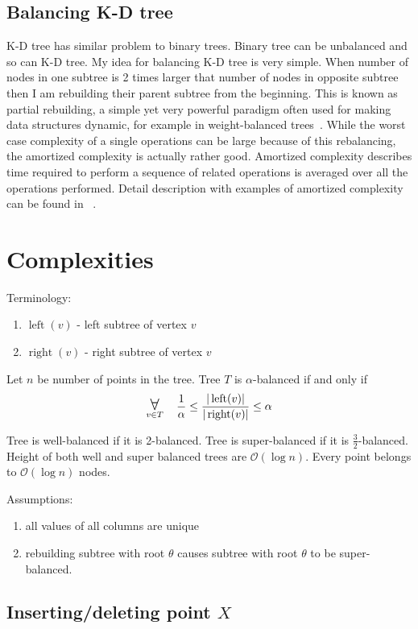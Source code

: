 \documentclass[10pt,a4paper]{article}
\DeclareMathOperator{\rightSon}{right}
\DeclareMathOperator{\leftSon}{left}
\newcommand{\Oh}{\mathcal{O}}
\newcommand\bigforall{\mbox{\Large $\mathsurround0pt\forall$}}
\begin{document}
\subsection{Balancing K-D tree}
K-D tree has similar problem to binary trees. Binary tree can be unbalanced and so can K-D tree. My idea for balancing K-D tree is very simple. When number of nodes in one subtree is 2 times larger that number of nodes in opposite subtree then I am rebuilding their parent subtree from the beginning.
This is known as partial rebuilding, a simple yet very powerful paradigm often used for making data structures dynamic, for example in weight-balanced trees~\cite{ALPHATREES}. While the worst case complexity of a single operations can be large because of this rebalancing, the amortized complexity is actually rather good. Amortized complexity describes time required to perform a sequence of related operations is averaged over all the operations performed. Detail description with examples of amortized complexity can be found in ~\cite{AMOR}.

\section{Complexities}

Terminology:
\begin{enumerate}
\item $\leftSon(v)$ - left subtree of vertex $v$
\item $\rightSon(v)$ - right subtree of vertex $v$
\end{enumerate}

Let $n$ be number of points in the tree. Tree $T$ is $\alpha$-balanced if and only if 
$$\displaystyle\mathop{\bigforall}_{v\in T} \quad \frac{1}{\alpha} \leq \frac{|\leftSon(v)|}{|\rightSon(v)|} \leq \alpha$$

Tree is well-balanced if it is 2-balanced. Tree is super-balanced if it is  $\frac{3}{2}$-balanced. Height of both well and super balanced trees are $\Oh(\log n)$. Every point belongs to $\Oh(\log n)$ nodes. 

Assumptions:
\begin{enumerate}
\item all values of all columns are unique
\item rebuilding subtree with root $\theta$ causes subtree with root $\theta$ to be super-balanced.
\end{enumerate}

\subsection{Inserting/deleting point $X$}
\end{document}
